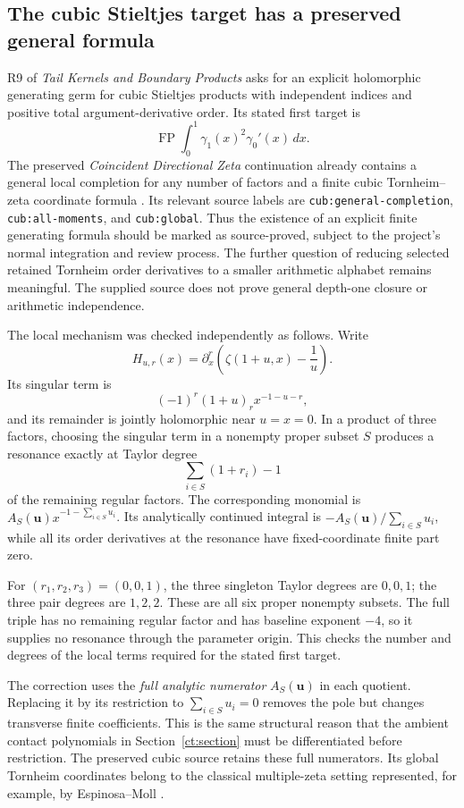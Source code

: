 \documentclass[11pt,letterpaper]{article}
\numberwithin{equation}{section}
\theoremstyle{definition}
\theoremstyle{remark}
\DeclareMathOperator{\FP}{FP}
\newcommand{\dd}{\,d}
\newcommand{\src}[1]{\nolinkurl{#1}}
\begin{document}
\subsection{The cubic Stieltjes target has a preserved general formula}

R9 of \emph{Tail Kernels and Boundary Products} asks for an explicit
holomorphic generating germ for cubic Stieltjes products with independent
indices and positive total argument-derivative order. Its stated first
target is
\[
 \FP\int_0^1\gamma_1(x)^2\gamma_0'(x)\dd x.
\]
The preserved \emph{Coincident Directional Zeta} continuation already
contains a general local completion for any number of factors and a finite
cubic Tornheim--zeta coordinate formula
\cite{ProveItCubic}. Its relevant source labels are
\src{cub:general-completion},
\src{cub:all-moments}, and \src{cub:global}.
Thus the existence of an explicit finite generating formula should be
marked as source-proved, subject to the project's normal integration and
review process. The further question of reducing selected retained
Tornheim order derivatives to a smaller arithmetic alphabet remains
meaningful. The supplied source does not prove general depth-one closure
or arithmetic independence.

The local mechanism was checked independently as follows. Write
\[
 H_{u,r}(x)=\partial_x^r\left(\zeta(1+u,x)-\frac1u\right).
\]
Its singular term is
\[
 (-1)^r(1+u)_r x^{-1-u-r},
\]
and its remainder is jointly holomorphic near \(u=x=0\). In a product
of three factors, choosing the singular term in a nonempty proper subset
\(S\) produces a resonance exactly at Taylor degree
\begin{equation}\label{au:resonant-degree}
  \sum_{i\in S}(1+r_i)-1
\end{equation}
of the remaining regular factors. The corresponding monomial is
\(A_S(\boldsymbol u)x^{-1-\sum_{i\in S}u_i}\). Its analytically
continued integral is
\(-A_S(\boldsymbol u)/\sum_{i\in S}u_i\), while all its order derivatives
at the resonance have fixed-coordinate finite part zero.

For \((r_1,r_2,r_3)=(0,0,1)\), the three singleton Taylor degrees are
\(0,0,1\); the three pair degrees are \(1,2,2\). These are all six
proper nonempty subsets. The full triple has no remaining regular factor
and has baseline exponent \(-4\), so it supplies no resonance through the
parameter origin. This checks the number and degrees of the local terms
required for the stated first target.

The correction uses the \emph{full analytic numerator}
\(A_S(\boldsymbol u)\) in each quotient. Replacing it by its restriction
to \(\sum_{i\in S}u_i=0\) removes the pole but changes transverse finite
coefficients. This is the same structural reason that the ambient contact
polynomials in Section~\ref{ct:section} must be differentiated before
restriction. The preserved cubic source retains these full numerators.
Its global Tornheim coordinates belong to the classical multiple-zeta
setting represented, for example, by Espinosa--Moll \cite{EspinosaMoll}.
\end{document}
